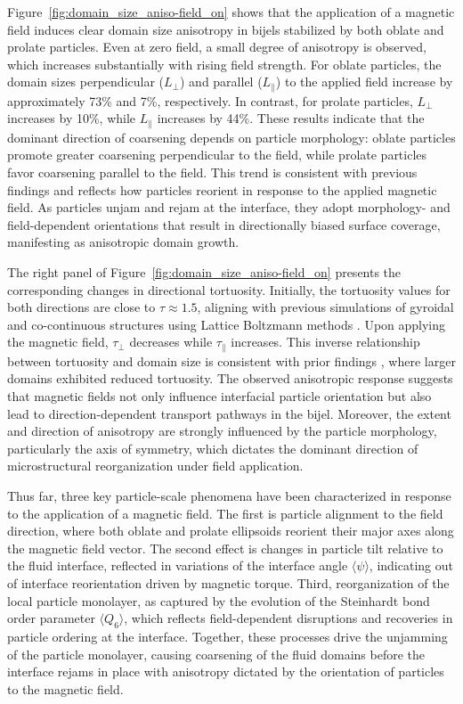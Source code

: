 Figure~\ref{fig:domain_size_aniso-field_on} shows that the application of a magnetic field induces clear domain size anisotropy in bijels stabilized by both oblate 
and prolate particles. Even at zero field, a small degree of anisotropy is observed, which increases substantially with rising field strength. For oblate particles, 
the domain sizes perpendicular (\(L_\perp\)) and parallel (\(L_\parallel\)) to the applied field increase by approximately 73\% and 7\%, respectively. In contrast, 
for prolate particles, \(L_\perp\) increases by 10\%, while \(L_\parallel\) increases by 44\%. These results indicate that the dominant direction of coarsening 
depends on particle morphology: oblate particles promote greater coarsening perpendicular to the field, while prolate particles favor coarsening parallel to the 
field. This trend is consistent with previous findings and reflects how particles reorient in response to the applied magnetic field. As particles unjam and rejam 
at the interface, they adopt morphology- and field-dependent orientations that result in directionally biased surface coverage, manifesting as anisotropic domain 
growth.

The right panel of Figure~\ref{fig:domain_size_aniso-field_on} presents the corresponding changes in directional tortuosity. Initially, the tortuosity values 
for both directions are close to \(\tau \approx 1.5\), aligning with previous simulations of gyroidal and co-continuous structures using Lattice Boltzmann methods 
\cite{luo_macroscopic_2020}. Upon applying the magnetic field, \(\tau_\perp\) decreases while \(\tau_\parallel\) increases. This inverse relationship between 
tortuosity and domain size is consistent with prior findings \cite{karthikeyan_formation_2024}, where larger domains exhibited 
reduced tortuosity. The observed anisotropic response suggests that magnetic fields not only influence interfacial particle orientation but also lead to 
direction-dependent transport pathways in the bijel. Moreover, the extent and direction of anisotropy are strongly influenced by the particle morphology, 
particularly the axis of symmetry, which dictates the dominant direction of microstructural reorganization under field application.

Thus far, three key particle-scale phenomena have been characterized in response to the application of a magnetic field. The first is
particle alignment to the field direction, where both oblate and prolate ellipsoids reorient their major axes along the magnetic field vector. The second effect is
changes in particle tilt relative to the fluid interface, reflected in variations of the interface angle \(\langle \psi \rangle\), indicating out of interface 
reorientation driven by magnetic torque. Third, reorganization of the local particle monolayer, as captured by the evolution of the Steinhardt bond order parameter 
\(\langle Q_6 \rangle\), which reflects field-dependent disruptions and recoveries in particle ordering at the interface. Together, these processes 
drive the unjamming of the particle monolayer, causing coarsening of the fluid domains before the interface rejams in place with anisotropy dictated by the orientation
of particles to the magnetic field.

